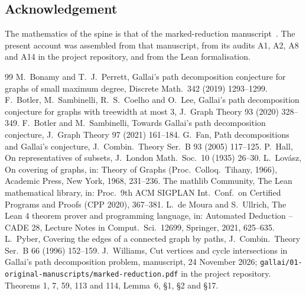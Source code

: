 \documentclass[11pt]{amsart}
\theoremstyle{definition}
\theoremstyle{remark}
\renewcommand{\_}{\oldunderscore\allowbreak}
\begin{document}
\subsection*{Acknowledgement}
The mathematics of the spine is that of the marked-reduction manuscript~\cite{MR}. The present
account was assembled from that manuscript, from its audits A1, A2, A8 and A14 in the project
repository, and from the Lean formalisation.

\begin{thebibliography}{99}
 M.~Bonamy and T.~J.~Perrett, Gallai's path decomposition conjecture for graphs of small
maximum degree, Discrete Math.\ 342 (2019) 1293--1299.
 F.~Botler, M.~Sambinelli, R.~S.~Coelho and O.~Lee, Gallai's path decomposition
conjecture for graphs with treewidth at most 3, J.\ Graph Theory 93 (2020) 328--349.
 F.~Botler and M.~Sambinelli, Towards Gallai's path decomposition conjecture, J.\ Graph
Theory 97 (2021) 161--184.
 G.~Fan, Path decompositions and Gallai's conjecture, J.\ Combin.\ Theory Ser.~B 93
(2005) 117--125.
 P.~Hall, On representatives of subsets, J.\ London Math.\ Soc.\ 10 (1935) 26--30.
 L.~Lov\'asz, On covering of graphs, in: Theory of Graphs (Proc.\ Colloq.\ Tihany,
1966), Academic Press, New York, 1968, 231--236.
 The mathlib Community, The Lean mathematical library, in: Proc.\ 9th ACM SIGPLAN
Int.\ Conf.\ on Certified Programs and Proofs (CPP 2020), 367--381.
 L.~de Moura and S.~Ullrich, The Lean 4 theorem prover and programming language, in:
Automated Deduction -- CADE 28, Lecture Notes in Comput.\ Sci.\ 12699, Springer, 2021, 625--635.
 L.~Pyber, Covering the edges of a connected graph by paths, J.\ Combin.\ Theory
Ser.~B 66 (1996) 152--159.
 J.~Williams, Cut vertices and cycle intersections in Gallai's path decomposition problem,
manuscript, 24 November 2026; \texttt{gallai/01-original-manuscripts/marked-reduction.pdf} in the
project repository. Theorems 1, 7, 59, 113 and 114, Lemma~6, \S1, \S2 and \S17.
\end{thebibliography}
\end{document}
